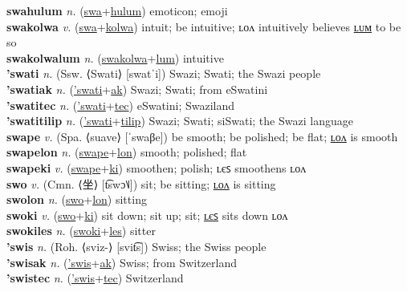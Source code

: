 \textbf{swahulum} \textit{n.} (\hyperref[swa]{swa}+\hyperref[hulum]{hulum})
emoticon; emoji \label{swahulum} \\
\textbf{swakolwa} \textit{v.} (\hyperref[swa]{swa}+\hyperref[kolwa]{kolwa})
intuit; be intuitive; ʟᴏᴧ intuitively believes \hyperref[swakolwalum]{ʟᴜᴍ} to be so \label{swakolwa} \\
\textbf{swakolwalum} \textit{n.} (\hyperref[swakolwa]{swakolwa}+\hyperref[lum]{lum})
intuitive \label{swakolwalum} \\
\textbf{'swati} \textit{n.} (Ssw. ⟨Swati⟩ [swatˈi])
Swazi; Swati; the Swazi people \label{'swati} \\
\textbf{'swatiak} \textit{n.} (\hyperref['swati]{'swati}+\hyperref[ak]{ak})
Swazi; Swati; from eSwatini \label{'swatiak} \\
\textbf{'swatitec} \textit{n.} (\hyperref['swati]{'swati}+\hyperref[tec]{tec})
eSwatini; Swaziland \label{'swatitec} \\
\textbf{'swatitilip} \textit{n.} (\hyperref['swati]{'swati}+\hyperref[tilip]{tilip})
Swazi; Swati; siSwati; the Swazi language \label{'swatitilip} \\
\textbf{swape} \textit{v.} (Spa. ⟨suave⟩ [ˈswaβe])
be smooth; be polished; be flat; \hyperref[swapelon]{ʟᴏᴧ} is smooth \label{swape} \\
\textbf{swapelon} \textit{n.} (\hyperref[swape]{swape}+\hyperref[lon]{lon})
smooth; polished; flat \label{swapelon} \\
\textbf{swapeki} \textit{v.} (\hyperref[swape]{swape}+\hyperref[ki]{ki})
smoothen; polish; ʟєꜱ smoothens ʟᴏᴧ \label{swapeki} \\
\textbf{swo} \textit{v.} (Cmn. ⟨坐⟩ [t͡swɔ˥˩])
sit; be sitting; \hyperref[swolon]{ʟᴏᴧ} is sitting \label{swo} \\
\textbf{swolon} \textit{n.} (\hyperref[swo]{swo}+\hyperref[lon]{lon})
sitting \label{swolon} \\
\textbf{swoki} \textit{v.} (\hyperref[swo]{swo}+\hyperref[ki]{ki})
sit down; sit up; sit; \hyperref[swokiles]{ʟєꜱ} sits down ʟᴏᴧ \label{swoki} \\
\textbf{swokiles} \textit{n.} (\hyperref[swoki]{swoki}+\hyperref[les]{les})
sitter \label{swokiles} \\
\textbf{'swis} \textit{n.} (Roh. ⟨sviz-⟩ [svit͡s])
Swiss; the Swiss people \label{'swis} \\
\textbf{'swisak} \textit{n.} (\hyperref['swis]{'swis}+\hyperref[ak]{ak})
Swiss; from Switzerland \label{'swisak} \\
\textbf{'swistec} \textit{n.} (\hyperref['swis]{'swis}+\hyperref[tec]{tec})
Switzerland \label{'swistec} \\
